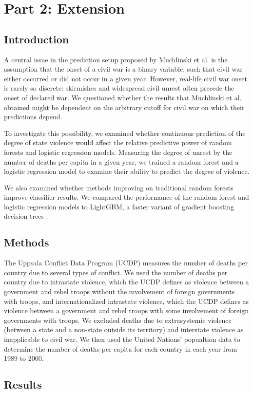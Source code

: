 \documentclass{article}
\begin{document}
\section*{Part 2: Extension}
\subsection*{Introduction}
A central issue in the prediction setup proposed by Muchlinski et al. is the assumption that the onset of a civil war is a binary variable, such that civil war either occurred or did not occur in a given year. However, real-life civil war onset is rarely so discrete: skirmishes and widespread civil unrest often precede the onset of declared war. We questioned whether the results that Muchlinski et al. obtained might be dependent on the arbitrary cutoff for civil war on which their predictions depend.

To investigate this possibility, we examined whether continuous prediction of the degree of state violence would affect the relative predictive power of random forests and logistic regression models. Measuring the degree of unrest by the number of deaths per capita in a given year, we trained a random forest and a logistic regression model to examine their ability to predict the degree of violence.

We also examined whether methods improving on traditional random forests improve classifier results. We compared the performance of the random forest and logistic regression models to LightGBM, a faster variant of gradient boosting decision trees \citep{ke2017lightgbm}.

\subsection*{Methods}
The Uppsala Conflict Data Program (UCDP) measures the number of deaths per country due to several types of conflict. We used the number of deaths per country due to intrastate violence, which the UCDP defines as violence between a government and rebel troops without the involvement of foreign governments with troops, and internationalized intrastate violence, which the UCDP defines as violence between a government and rebel troops with some involvement of foreign governments with troops. We excluded deaths due to extrasystemic violence (between a state and a non-state outside its territory) and interstate violence as inapplicable to civil war. We then used the United Nations' popualtion data to determine the number of deaths per capita for each country in each year from 1989 to 2000.

\subsection*{Results}

\newpage

\renewcommand\refname{Bibliography}


\end{document}
